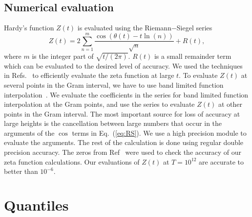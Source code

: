 \documentclass[twoside]{article}
\begin{document}
\subsection{\label{numerics}Numerical evaluation}


Hardy's function $Z(t)$  is evaluated using the Riemann$-$Siegel series
\begin{equation}
Z(t) = 2\sum^{m}_{n=1}\frac{\cos(\theta(t) - t \ln (n))}{\sqrt{n}} + R(t), 
\label{eq:RS}
\end{equation}
where $m$ is the integer part of $\sqrt{t/(2\pi)}$. $R(t)$ is a small remainder
term which can be evaluated to the desired level of accuracy. We used the techniques in
 Refs.~\cite{Odlyzko 1992,hiary,gourdon} 
to efficiently evaluate the zeta function at large $t$. To evaluate  $Z(t)$  at several points 
in the Gram interval, we have to use band limited function interpolation~\cite{Jerri 1977}. 
We evaluate the coefficients in the series for band limited function interpolation at the Gram points, 
and use the series to evaluate $Z(t)$ at other points in the Gram interval. The most important 
source for loss of accuracy at large heights is the cancellation between
large numbers that occur in the arguments of the $\cos$ terms in Eq.~(\ref{eq:RS}). We 
use a high precision module to evaluate the arguments. The rest of the calculation
is done using regular double precision accuracy. The  zeros from Ref~\cite{hiary 2010} 
were used 
to check the accuracy of our zeta function calculations. 
Our evaluations of $Z(t)$ at $T=10^{12}$ 
are accurate 
to better than $10^{-6}$. 


\section{\label{sec4}Quantiles}
  
\end{document}
